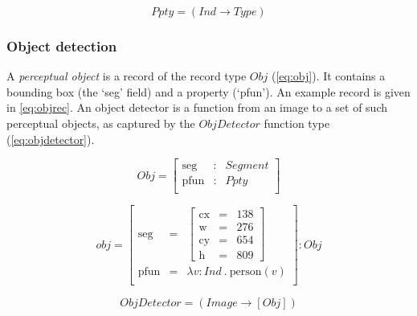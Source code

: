 \begin{equation}\label{eq:ppty}
Ppty = (Ind \rightarrow Type)\end{equation}




\subsubsection{Object detection}

A \textit{perceptual object} is a record of the record type $Obj$ (\autoref{eq:obj}).
It contains a bounding box (the `seg' field) and a property (`pfun').
An example record is given in \autoref{eq:objrec}.
An object detector is a function from an image to a set of such perceptual objects, as captured by the $ObjDetector$ function type (\autoref{eq:objdetector}).


\begin{equation}\label{eq:obj}
Obj = \left[\begin{array}{rcl}
\text{seg} &:& Segment\\
\text{pfun} &:& Ppty \\
\end{array}\right]\end{equation}

\begin{equation}\label{eq:objrec}
obj =
\left[\begin{array}{rcl}
\text{seg} &=& \left[\begin{array}{rcl}
\text{cx} &=& 138\\
\text{w} &=& 276\\
\text{cy} &=& 654\\
\text{h} &=& 809
\end{array}\right]\\
\text{pfun} &=& \lambda v:Ind\ .\ \text{person}(v)\\
\end{array}\right] : Obj\end{equation}

\begin{equation}\label{eq:objdetector}
ObjDetector = ( Image \rightarrow [Obj] )
\end{equation}



